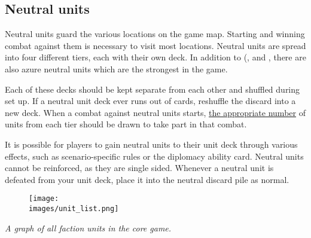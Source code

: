 \subsection*{Neutral units}
Neutral units guard the various locations on the game map.
Starting and winning combat against them is necessary to visit most locations.
Neutral units are spread into four different tiers, each with their own deck.
In addition to (,  and , there are also azure  neutral units which are the strongest in the game.\par
Each of these decks should be kept separate from each other and shuffled during set up.
If a neutral unit deck ever runs out of cards, reshuffle the discard into a new deck.
When a combat against neutral units starts, \hyperlink{Difficulty}{the appropriate number} of units from each tier should be drawn to take part in that combat.\par
It is possible for players to gain neutral units to their unit deck through various effects, such as scenario-specific rules or the diplomacy ability card.
Neutral units cannot be reinforced, as they are single sided.
Whenever a neutral unit is defeated from your unit deck, place it into the neutral discard pile as normal.
\begin{figure}[h]
  \centering
  \texttt{[image: \\images/unit\_list.png]}
\end{figure}
\begin{center}
  \textit{A graph of all faction units in the core game.}
\end{center}
